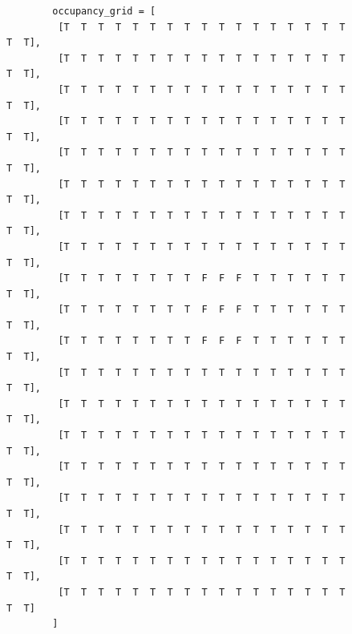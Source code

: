 \begin{figure}[h!]
	\small
	\centering	
	\begin{minipage}{0.46\textwidth}%
	\begin{verbatim}
		occupancy_grid = [
		 [T  T  T  T  T  T  T  T  T  T  T  T  T  T  T  T  T  T  T],
		 [T  T  T  T  T  T  T  T  T  T  T  T  T  T  T  T  T  T  T],
		 [T  T  T  T  T  T  T  T  T  T  T  T  T  T  T  T  T  T  T],
		 [T  T  T  T  T  T  T  T  T  T  T  T  T  T  T  T  T  T  T],
		 [T  T  T  T  T  T  T  T  T  T  T  T  T  T  T  T  T  T  T],
		 [T  T  T  T  T  T  T  T  T  T  T  T  T  T  T  T  T  T  T],
		 [T  T  T  T  T  T  T  T  T  T  T  T  T  T  T  T  T  T  T],
		 [T  T  T  T  T  T  T  T  T  T  T  T  T  T  T  T  T  T  T],
		 [T  T  T  T  T  T  T  T  F  F  F  T  T  T  T  T  T  T  T],
		 [T  T  T  T  T  T  T  T  F  F  F  T  T  T  T  T  T  T  T],
		 [T  T  T  T  T  T  T  T  F  F  F  T  T  T  T  T  T  T  T],
		 [T  T  T  T  T  T  T  T  T  T  T  T  T  T  T  T  T  T  T],
		 [T  T  T  T  T  T  T  T  T  T  T  T  T  T  T  T  T  T  T],
		 [T  T  T  T  T  T  T  T  T  T  T  T  T  T  T  T  T  T  T],
		 [T  T  T  T  T  T  T  T  T  T  T  T  T  T  T  T  T  T  T],
		 [T  T  T  T  T  T  T  T  T  T  T  T  T  T  T  T  T  T  T],
		 [T  T  T  T  T  T  T  T  T  T  T  T  T  T  T  T  T  T  T],
		 [T  T  T  T  T  T  T  T  T  T  T  T  T  T  T  T  T  T  T],
		 [T  T  T  T  T  T  T  T  T  T  T  T  T  T  T  T  T  T  T]
		]
	\end{verbatim}
	\end{minipage}
	\hspace*{\fill}
	\begin{minipage}{0.46\textwidth}%
		\footnotesize

\end{minipage}
\end{figure}
